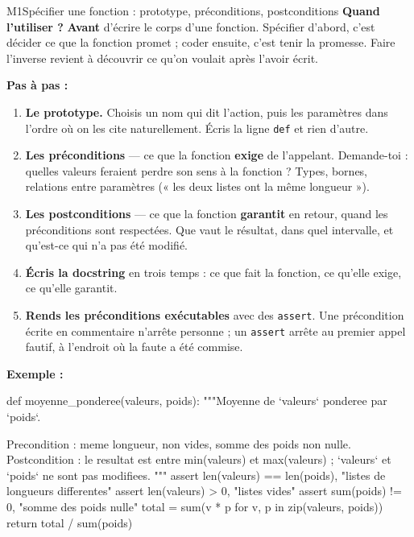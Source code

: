 \begin{fichemethode}{M1}{Spécifier une fonction : prototype, préconditions, postconditions}
\textbf{Quand l'utiliser ?} \textbf{Avant} d'écrire le corps d'une fonction. Spécifier
d'abord, c'est décider ce que la fonction promet ; coder ensuite, c'est tenir la promesse.
Faire l'inverse revient à découvrir ce qu'on voulait après l'avoir écrit.

\textbf{Pas à pas :}
\begin{enumerate}
  \item \textbf{Le prototype.} Choisis un nom qui dit l'action, puis les paramètres dans
    l'ordre où on les cite naturellement. Écris la ligne \lstinline{def} et rien d'autre.
  \item \textbf{Les préconditions} — ce que la fonction \textbf{exige} de l'appelant.
    Demande-toi : quelles valeurs feraient perdre son sens à la fonction ? Types, bornes,
    relations entre paramètres (« les deux listes ont la même longueur »).
  \item \textbf{Les postconditions} — ce que la fonction \textbf{garantit} en retour, quand
    les préconditions sont respectées. Que vaut le résultat, dans quel intervalle, et
    qu'est-ce qui n'a pas été modifié.
  \item \textbf{Écris la docstring} en trois temps : ce que fait la fonction, ce qu'elle
    exige, ce qu'elle garantit.
  \item \textbf{Rends les préconditions exécutables} avec des \lstinline{assert}. Une
    précondition écrite en commentaire n'arrête personne ; un \lstinline{assert} arrête au
    premier appel fautif, à l'endroit où la faute a été commise.
\end{enumerate}

\textbf{Exemple :}
\begin{python}
def moyenne_ponderee(valeurs, poids):
    """Moyenne de `valeurs` ponderee par `poids`.

    Precondition  : meme longueur, non vides, somme des poids non nulle.
    Postcondition : le resultat est entre min(valeurs) et max(valeurs) ;
                    `valeurs` et `poids` ne sont pas modifiees.
    """
    assert len(valeurs) == len(poids), "listes de longueurs differentes"
    assert len(valeurs) > 0, "listes vides"
    assert sum(poids) != 0, "somme des poids nulle"
    total = sum(v * p for v, p in zip(valeurs, poids))
    return total / sum(poids)
\end{python}


\end{fichemethode}
